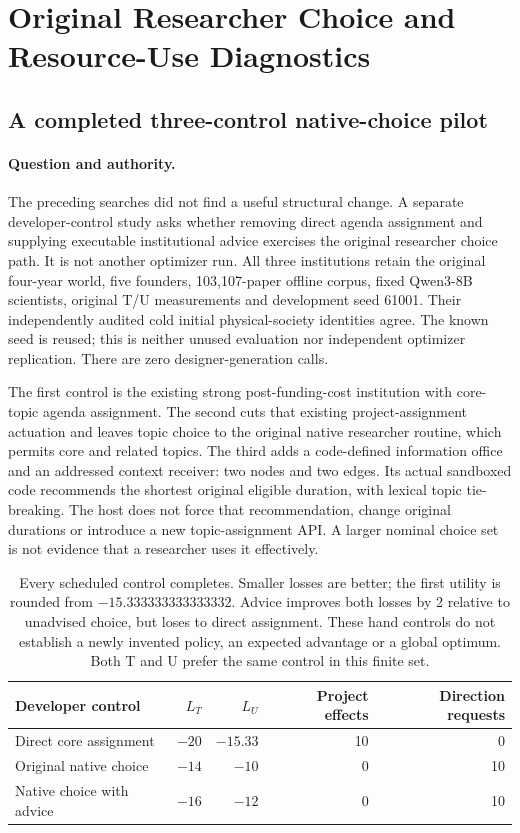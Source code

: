 \section{Original Researcher Choice and Resource-Use Diagnostics}
\label{sec:native-choice-resource}

\subsection{A completed three-control native-choice pilot}
\paragraph{Question and authority.}
The preceding searches did not find a useful structural change. A separate
developer-control study asks whether removing direct agenda assignment and
supplying executable institutional advice exercises the original researcher
choice path. It is not another optimizer run. All three institutions retain
the original four-year world, five founders, 103,107-paper offline corpus,
fixed Qwen3-8B scientists, original T/U measurements and development seed 61001.
Their independently audited cold initial physical-society identities agree.
The known seed is reused; this is neither unused evaluation nor independent
optimizer replication. There are zero designer-generation calls.

The first control is the existing strong post-funding-cost institution with
core-topic agenda assignment. The second cuts that existing project-assignment
actuation and leaves topic choice to the original native researcher routine,
which permits core and related topics. The third adds a code-defined
information office and an addressed context receiver: two nodes and two edges.
Its actual sandboxed code recommends the shortest original eligible duration,
with lexical topic tie-breaking. The host does not force that recommendation,
change original durations or introduce a new topic-assignment API. A larger
nominal choice set is not evidence that a researcher uses it effectively.

\begin{table}[t]
\centering\small
\begin{tabular}{lrrrr}
\toprule
Developer control & $L_T$ & $L_U$ & Project effects & Direction requests \\
\midrule
Direct core assignment & $-20$ & $-15.33$ & 10 & 0 \\
Original native choice & $-14$ & $-10$ & 0 & 10 \\
Native choice with advice & $-16$ & $-12$ & 0 & 10 \\
\bottomrule
\end{tabular}
\caption{Every scheduled control completes. Smaller losses are better; the
first utility is rounded from $-15.333333333333332$. Advice improves both losses
by 2 relative to unadvised choice, but loses to direct assignment. These hand
controls do not establish a newly invented policy, an expected advantage or a
global optimum. Both T and U prefer the same control in this finite set.}
\label{tab:original-choice-controls}
\end{table}

